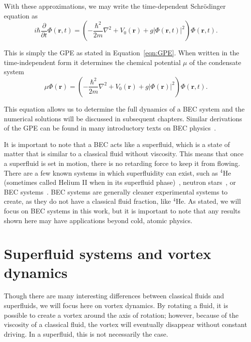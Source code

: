 With these approximations, we may write the time-dependent Schr\"odinger equation as
\begin{equation}
    i\hbar \frac{\partial}{\partial t}\Phi(\mathbf{r},t) = \left( - \frac{\hbar^2}{2m} \nabla^2 + V_0(\mathbf{r}) + g |\Phi(\mathbf{r},t)|^2\right)\Phi(\mathbf{r},t).
\end{equation}

This is simply the GPE as stated in Equation~\eqref{eqn:GPE}.
When written in the time-independent form it determines the chemical potential $\mu$ of the condensate system~\cite{gross1961, pitaevskii1961}
\begin{equation}
    \mu\Phi(\mathbf{r}) = \left( - \frac{\hbar^2}{2m} \nabla^2 + V_0(\mathbf{r}) + g |\Phi(\mathbf{r})|^2\right)\Phi(\mathbf{r},t).
    \label{eqn:GP}
\end{equation}

This equation allows us to determine the full dynamics of a BEC system and the numerical solutions will be discussed in subsequent chapters.
Similar derivations of the GPE can be found in many introductory texts on BEC physics~\cite{fetter2003, pethick2002, fetter2009}.

It is important to note that a BEC acts like a superfluid, which is a state of matter that is similar to a classical fluid without viscosity.
This means that once a superfluid is set in motion, there is no retarding force to keep it from flowing.
There are a few known systems in which superfluidity can exist, such as $^4$He (sometimes called Helium II when in its superfluid phase)~\cite{allen1938}, neutron stars~\cite{migdal1960}, or BEC systems~\cite{einstein1925, anderson1995}.
BEC systems are generally cleaner experimental systems to create, as they do not have a classical fluid fraction, like $^4$He.
As stated, we will focus on BEC systems in this work, but it is important to note that any results shown here may have applications beyond cold, atomic physics.

\section{Superfluid systems and vortex dynamics}

Though there are many interesting differences between classical fluids and superfluids, we will focus here on vortex dynamics.
By rotating a fluid, it is possible to create a vortex around the axis of rotation; however, because of the viscosity of a classical fluid, the vortex will eventually disappear without constant driving.
In a superfluid, this is not necessarily the case.

